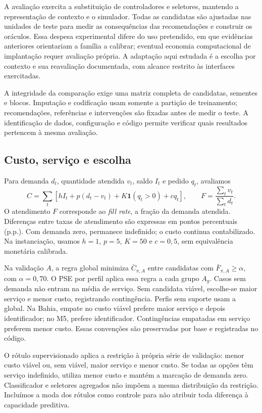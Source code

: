 \documentclass[preprint,12pt]{elsarticle}
\begin{document}
A avaliação exercita a substituição de controladores e seletores, mantendo a representação de contexto e o simulador. Todas as candidatas são ajustadas nas unidades de teste para medir as consequências das recomendações e construir os oráculos. Essa despesa experimental difere do uso pretendido, em que evidências anteriores orientariam a família a calibrar; eventual economia computacional de implantação requer avaliação própria. A adaptação aqui estudada é a escolha por contexto e sua reavaliação documentada, com alcance restrito às interfaces exercitadas.

A integridade da comparação exige uma matriz completa de candidatas, sementes e blocos. Imputação e codificação usam somente a partição de treinamento; recomendações, referências e intervenções são fixadas antes de medir o teste. A identificação de dados, configuração e código permite verificar quais resultados pertencem à mesma avaliação.

\subsection{Custo, serviço e escolha}
Para demanda $d_t$, quantidade atendida $v_t$, saldo $I_t$ e pedido $q_t$, avaliamos
\begin{equation}
 C=\sum_t[hI_t+p(d_t-v_t)+K\mathbf1(q_t>0)+cq_t],
 \qquad F=\frac{\sum_t v_t}{\sum_t d_t}.
 \label{eq:metrics}
\end{equation}
O atendimento $F$ corresponde ao \textit{fill rate}, a fração da demanda atendida. Diferenças entre taxas de atendimento são expressas em pontos percentuais (p.p.). Com demanda zero, permanece indefinido; o custo continua contabilizado. Na instanciação, usamos $h=1$, $p=5$, $K=50$ e $c=0{,}5$, sem equivalência monetária calibrada.

Na validação $A$, a regra global minimiza $\bar C_{\pi,A}$ entre candidatas com $\bar F_{\pi,A}\geq\alpha$, com $\alpha=0{,}70$. O PSE por perfil aplica essa regra a cada grupo $A_g$. Casos sem demanda não entram na média de serviço. Sem candidata viável, escolhe-se maior serviço e menor custo, registrando contingência. Perfis sem suporte usam a global. Na Bahia, empate no custo viável prefere maior serviço e depois identificador; no M5, prefere identificador. Contingências empatadas em serviço preferem menor custo. Essas convenções são preservadas por base e registradas no código.

O rótulo supervisionado aplica a restrição à própria série de validação: menor custo viável ou, sem viável, maior serviço e menor custo. Se todas as opções têm serviço indefinido, utiliza menor custo e mantém a marcação de demanda zero. Classificador e seletores agregados não impõem a mesma distribuição da restrição. Incluímos a moda dos rótulos como controle para não atribuir toda diferença à capacidade preditiva.
\end{document}
